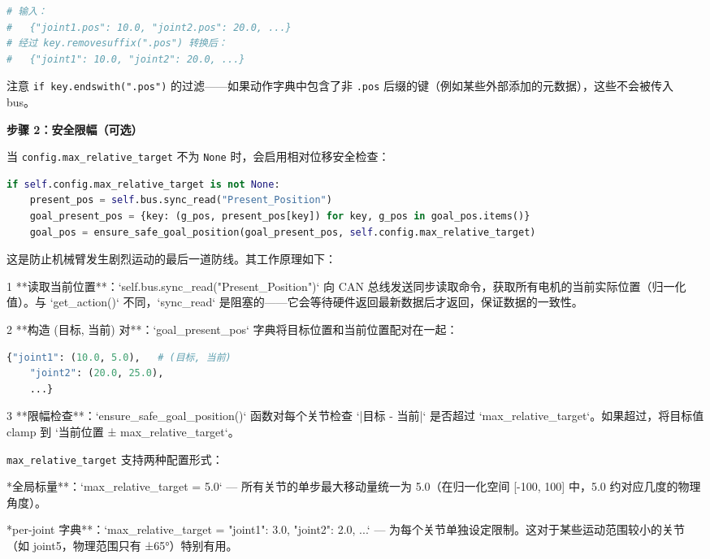 \documentclass[UTF8,a4paper,11pt]{ctexart}
\begin{document}
{\begin{lstlisting}[language=python]
# 输入：
#   {"joint1.pos": 10.0, "joint2.pos": 20.0, ...}
# 经过 key.removesuffix(".pos") 转换后：
#   {"joint1": 10.0, "joint2": 20.0, ...}
\end{lstlisting}

注意 \texttt{if key.endswith(".pos")} 的过滤——如果动作字典中包含了非 \texttt{.pos} 后缀的键（例如某些外部添加的元数据），这些不会被传入 bus。

\textbf{步骤 2：安全限幅（可选）}

当 \texttt{config.max_relative_target} 不为 \texttt{None} 时，会启用相对位移安全检查：

\begin{lstlisting}[language=python]
if self.config.max_relative_target is not None:
    present_pos = self.bus.sync_read("Present_Position")
    goal_present_pos = {key: (g_pos, present_pos[key]) for key, g_pos in goal_pos.items()}
    goal_pos = ensure_safe_goal_position(goal_present_pos, self.config.max_relative_target)
\end{lstlisting}

这是防止机械臂发生剧烈运动的最后一道防线。其工作原理如下：

\item[1] **读取当前位置**：`self.bus.sync_read("Present_Position")` 向 CAN 总线发送同步读取命令，获取所有电机的当前实际位置（归一化值）。与 `get_action()` 不同，`sync_read` 是阻塞的——它会等待硬件返回最新数据后才返回，保证数据的一致性。

\item[2] **构造 (目标, 当前) 对**：`goal_present_pos` 字典将目标位置和当前位置配对在一起：
\begin{lstlisting}[language=python]
   {"joint1": (10.0, 5.0),   # (目标, 当前)
    "joint2": (20.0, 25.0),
    ...}
\end{lstlisting}

\item[3] **限幅检查**：`ensure_safe_goal_position()` 函数对每个关节检查 `|目标 - 当前|` 是否超过 `max_relative_target`。如果超过，将目标值 clamp 到 `当前位置 ± max_relative_target`。

\texttt{max_relative_target} 支持两种配置形式：

\item **全局标量**：`max_relative_target = 5.0` — 所有关节的单步最大移动量统一为 5.0（在归一化空间 [-100, 100] 中，5.0 约对应几度的物理角度）。
\item **per-joint 字典**：`max_relative_target = {"joint1": 3.0, "joint2": 2.0, ...}` — 为每个关节单独设定限制。这对于某些运动范围较小的关节（如 joint5，物理范围只有 ±65°）特别有用。

}
\end{document}
